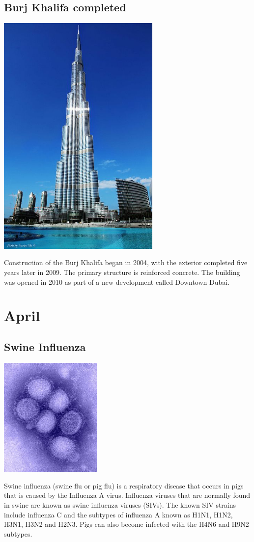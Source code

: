 \documentclass[11pt]{report}
\begin{document}
\subsection{Burj Khalifa completed}
\vspace{2mm}\begin{center}\includegraphics[width=8cm]{./img/burjKhalifa.jpg}\end{center}
Construction of the Burj Khalifa began in 2004, with the exterior completed five years later in 2009. The primary structure is reinforced concrete. The building was opened in 2010 as part of a new development called Downtown Dubai.

\section{April}
\subsection{Swine Influenza}
\vspace{2mm}\begin{center}\includegraphics[width=5cm]{./img/h1N1.jpg}\end{center}
Swine influenza (swine flu or pig flu) is a respiratory disease that occurs in pigs that is caused by the Influenza A virus. Influenza viruses that are normally found in swine are known as swine influenza viruses (SIVs). The known SIV strains include influenza C and the subtypes of influenza A known as H1N1, H1N2, H3N1, H3N2 and H2N3. Pigs can also become infected with the H4N6 and H9N2 subtypes.
\end{document}
